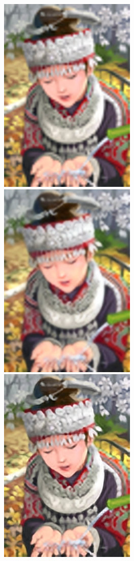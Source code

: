 \documentclass[runningheads]{llncs}
\begin{document}
\begin{figure}[t]
  \includegraphics[width=\mywidth]{set14_5_bicubic.png}
  \includegraphics[width=\mywidth]{set14_5_pixel.png}
  \includegraphics[width=\mywidth]{set14_5_srcnn.png}

\end{figure}
\end{document}
